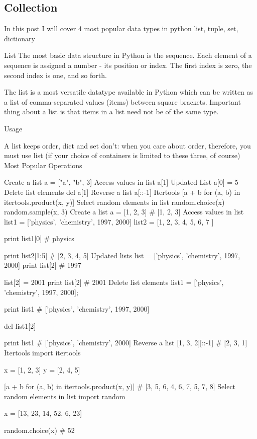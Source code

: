 \subsection{Collection}

In this post I will cover 4 most popular data types in python list, tuple, set, dictionary

List
The most basic data structure in Python is the sequence. Each element of a sequence is assigned a number - its position or index. The first index is zero, the second index is one, and so forth.

The list is a most versatile datatype available in Python which can be written as a list of comma-separated values (items) between square brackets. Important thing about a list is that items in a list need not be of the same type.

Usage

A list keeps order, dict and set don't: when you care about order, therefore, you must use list (if your choice of containers is limited to these three, of course)
Most Popular Operations

Create a list
a = ["a", "b", 3]
Access values in list
a[1]
Updated List
a[0] = 5
Delete list elements
del a[1]
Reverse a list
a[::-1]
Itertools
[a + b for (a, b) in itertools.product(x, y)]
Select random elements in list
random.choice(x)
random.sample(x, 3)
Create a list
a = [1, 2, 3]
# [1, 2, 3]
Access values in list
list1 = ['physics', 'chemistry', 1997, 2000]
list2 = [1, 2, 3, 4, 5, 6, 7 ]

print list1[0]   # physics

print list2[1:5] # [2, 3, 4, 5]
Updated lists
list = ['physics', 'chemistry', 1997, 2000]
print list[2] # 1997

list[2] = 2001
print list[2] # 2001
Delete list elements
list1 = ['physics', 'chemistry', 1997, 2000];

print list1
# ['physics', 'chemistry', 1997, 2000]

del list1[2]

print list1
# ['physics', 'chemistry', 2000]
Reverse a list
[1, 3, 2][::-1]
# [2, 3, 1]
Itertools
import itertools

x = [1, 2, 3]
y = [2, 4, 5]

[a + b for (a, b) in itertools.product(x, y)]
# [3, 5, 6, 4, 6, 7, 5, 7, 8]
Select random elements in list
import random

x = [13, 23, 14, 52, 6, 23]

random.choice(x) # 52

